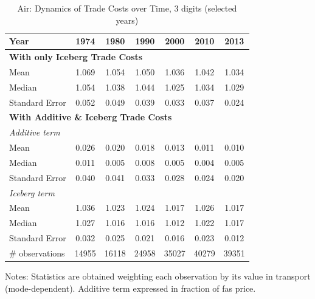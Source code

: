 \documentclass[a4paper,11pt]{article}
\begin{document}
\begin{table}[htbp]
  \centering
  \caption{Air: Dynamics of Trade Costs over Time, 3 digits (selected years)}
\begin{center}
    \begin{tabular}{l|cccccc}
\hline\hline

Year & 1974  & 1980  & 1990  & 2000  & 2010  & 2013   \\ \hline
\multicolumn{7}{l}{\textbf{With only Iceberg Trade Costs}}     \\
Mean  & 1.069 & 1.054 & 1.050 & 1.036 & 1.042 & 1.034  \\
Median & 1.054 & 1.038 & 1.044 & 1.025 & 1.034 & 1.029  \\
Standard Error & 0.052 & 0.049 & 0.039 & 0.033 & 0.037 & 0.024 \\
\hline
\multicolumn{7}{l}{\textbf{With Additive \& Iceberg Trade Costs }}    \\
\multicolumn{1}{l}{\textit{Additive term }} &       &       &       &       &       &      \\
\multicolumn{1}{l}{Mean } & 0.026 & 0.020 & 0.018 & 0.013 & 0.011 & 0.010  \\
\multicolumn{1}{l}{Median} & 0.011 & 0.005 & 0.008 & 0.005 & 0.004 & 0.005  \\
\multicolumn{1}{l}{Standard Error} & 0.040 & 0.041 & 0.033 & 0.028 & 0.024 & 0.020  \\
\multicolumn{1}{l}{\textit{Iceberg term}} &       &       &       &       &       &        \\
\multicolumn{1}{l}{Mean } & 1.036 & 1.023 & 1.024 & 1.017 & 1.026 & 1.017  \\
\multicolumn{1}{l}{Median} & 1.027 & 1.016 & 1.016 & 1.012 & 1.022 & 1.017 \\
Standard Error & 0.032 & 0.025 & 0.021 & 0.016 & 0.023 & 0.012  \\ \hline
\# observations & 14955 & 16118 & 24958 & 35027 & 40279 & 39351  \\
\hline\hline
    \end{tabular}%
  \end{center}
  \label{tab:result_air_3d_detail}%
\tiny{Notes: Statistics are obtained weighting each observation by its value in transport (mode-dependent). Additive term expressed in fraction of fas price. }
\end{table}%
\end{document}
